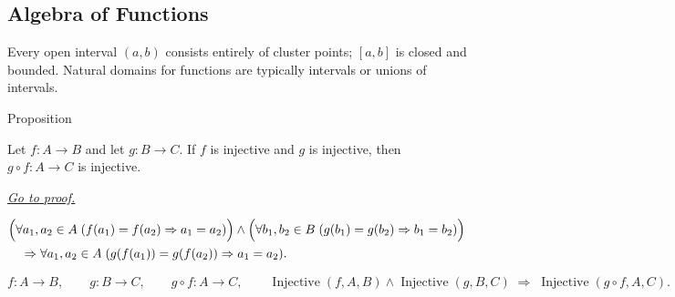
\subsection*{Algebra of Functions}
\label{sec:algebra-of-functions}
\begin{remark*}[Interpretation]
Every open interval $(a,b)$ consists entirely of cluster points;
$[a,b]$ is closed and bounded. Natural domains for functions are
typically intervals or unions of intervals.
\end{remark*}


\begin{propositionbox}{Proposition}
\begin{proposition}
\label{prop:composition-injective}
Let $f:A\to B$ and let $g:B\to C$. If $f$ is injective and $g$ is
injective, then $g\circ f:A\to C$ is injective.

\smallskip\noindent
\hyperref[prf:composition-injective]{\textit{Go to proof.}}
\end{proposition}
\end{propositionbox}

\begin{remark*}
\[
\begin{aligned}
&\Bigl(\forall a_1,a_2\in A\;(f(a_1)=f(a_2)\Rightarrow a_1=a_2)\Bigr)
\wedge
\Bigl(\forall b_1,b_2\in B\;(g(b_1)=g(b_2)\Rightarrow b_1=b_2)\Bigr) \\
&\quad\Rightarrow
\forall a_1,a_2\in A\;(g(f(a_1))=g(f(a_2))\Rightarrow a_1=a_2).
\end{aligned}
\]
\end{remark*}

\begin{remark*}
\[
  f\colon A\to B,\qquad
  g\colon B\to C,\qquad
  g\circ f\colon A\to C,\qquad
  \operatorname{Injective}(f,A,B)\wedge\operatorname{Injective}(g,B,C)
  \;\Longrightarrow\;
  \operatorname{Injective}(g\circ f,A,C).
\]
\end{remark*}

